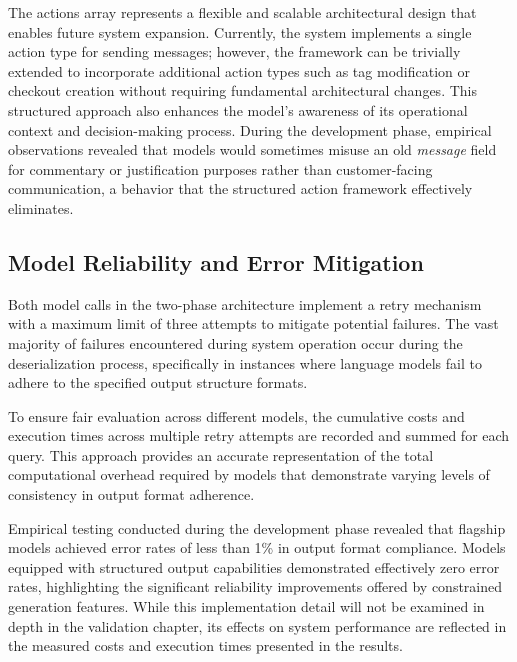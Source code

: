 The actions array represents a flexible and scalable architectural design that enables future system expansion.
Currently, the system implements a single action type for sending messages; however, the framework can be trivially extended to incorporate additional action types such as tag modification or checkout creation without requiring fundamental architectural changes.
This structured approach also enhances the model's awareness of its operational context and decision-making process.
During the development phase, empirical observations revealed that models would sometimes misuse an old \textit{message} field for commentary or justification purposes rather than customer-facing communication, a behavior that the structured action framework effectively eliminates.

\subsection{Model Reliability and Error Mitigation}

Both model calls in the two-phase architecture implement a retry mechanism with a maximum limit of three attempts to mitigate potential failures.
The vast majority of failures encountered during system operation occur during the deserialization process, specifically in instances where language models fail to adhere to the specified output structure formats.

To ensure fair evaluation across different models, the cumulative costs and execution times across multiple retry attempts are recorded and summed for each query.
This approach provides an accurate representation of the total computational overhead required by models that demonstrate varying levels of consistency in output format adherence.

Empirical testing conducted during the development phase revealed that flagship models achieved error rates of less than 1\% in output format compliance.
Models equipped with structured output capabilities demonstrated effectively zero error rates, highlighting the significant reliability improvements offered by constrained generation features.
While this implementation detail will not be examined in depth in the validation chapter, its effects on system performance are reflected in the measured costs and execution times presented in the results.
